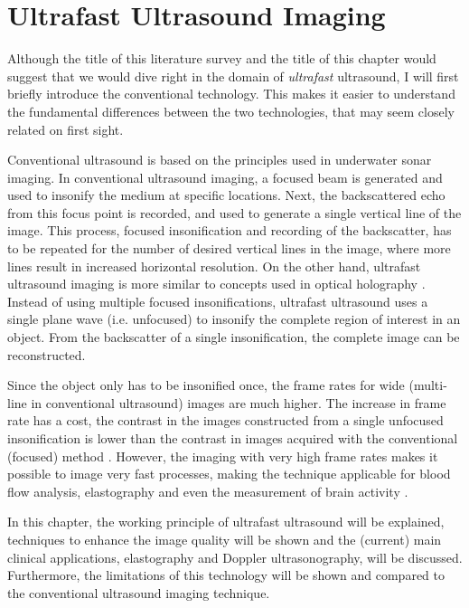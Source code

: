 \chapter{Ultrafast Ultrasound Imaging}
\label{chap:ultrafast_ultrasound}
Although the title of this literature survey and the title of this chapter would suggest that we would dive right in the domain of \textit{ultrafast} ultrasound, I will first briefly introduce the conventional technology. This makes it easier to understand the fundamental differences between the two technologies, that may seem closely related on first sight. 

Conventional ultrasound is based on the principles used in underwater sonar imaging. In conventional ultrasound imaging, a focused beam is generated and used to insonify the medium at specific locations. Next, the backscattered echo from this focus point is recorded, and used to generate a single vertical line of the image. This process, focused insonification and recording of the backscatter, has to be repeated for the number of desired vertical lines in the image, where more lines result in increased horizontal resolution. On the other hand, ultrafast ultrasound imaging is more similar to concepts used in optical holography \cite{tanter_ultrafast_2014}. Instead of using multiple focused insonifications, ultrafast ultrasound uses a single plane wave (i.e. unfocused) to insonify the complete region of interest in an object. From the backscatter of a single insonification, the complete image can be reconstructed.

Since the object only has to be insonified once, the frame rates for wide (multi-line in conventional ultrasound) images are much higher. The increase in frame rate has a cost, the contrast in the images constructed from a single unfocused insonification is lower than the contrast in images acquired with the conventional (focused) method \cite{sandrin_time-resolved_1999}. However, the imaging with very high frame rates makes it possible to image very fast processes, making the technique applicable for blood flow analysis, elastography and even the measurement of brain activity \cite{tanter_ultrafast_2014}. 

In this chapter, the working principle of ultrafast ultrasound will be explained, techniques to enhance the image quality will be shown and the (current) main clinical applications, elastography and Doppler ultrasonography, will be discussed. Furthermore, the limitations of this technology will be shown and compared to the conventional ultrasound imaging technique.




